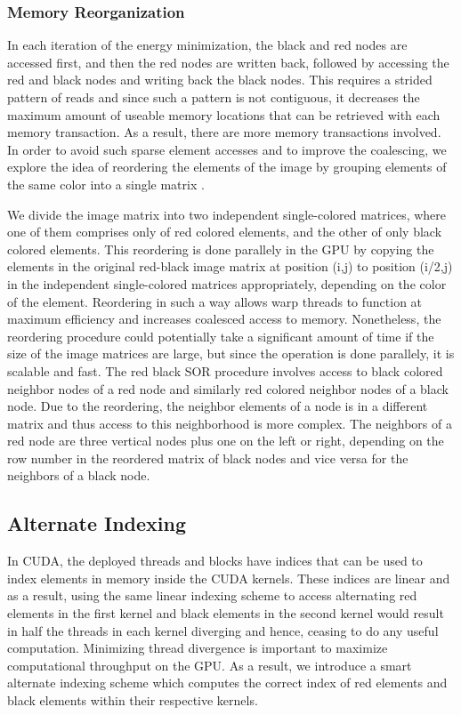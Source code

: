 \documentclass[english]{article}
\begin{document}
	\subsubsection{Memory Reorganization}
	In each iteration of the energy minimization, the black and red nodes are accessed first, and then the red nodes are written back, followed by accessing the red and black nodes and writing back the black nodes. This requires a strided pattern of reads and since such a pattern is not contiguous, it decreases the maximum amount of useable memory locations that can be retrieved with each memory transaction. As a result, there are more memory transactions involved. In order to avoid such sparse element accesses and to improve the coalescing, we explore the idea of reordering the elements of the image by grouping elements of the same color into a single matrix \cite{2}.\newline

	We divide the image matrix into two independent single-colored matrices, where one of them comprises only of red colored elements, and the other of only black colored elements. This reordering is done parallely in the GPU by copying the elements in the original red-black image matrix at position (i,j) to position (i/2,j) in the independent single-colored matrices appropriately, depending on the color of the element. Reordering in such a way allows warp threads to function at maximum efficiency and increases coalesced access to memory. Nonetheless, the reordering procedure could potentially take a significant amount of time if the size of the image matrices are large, but since the operation is done parallely, it is scalable and fast. The red black SOR procedure involves access to black colored neighbor nodes of a red node and similarly red colored neighbor nodes of a black node. Due to the reordering, the neighbor elements of a node is in a different matrix and thus access to this neighborhood is more complex. The neighbors of a red node are three vertical nodes plus one on the left or right, depending on the row number in the reordered matrix of black nodes and vice versa for the neighbors of a black node.

	\subsection{Alternate Indexing}
	In CUDA, the deployed threads and blocks have indices that can be used to index elements in memory inside the CUDA kernels. These indices are linear and as a result, using the same linear indexing scheme to access alternating red elements in the first kernel and black elements in the second kernel would result in half the threads in each kernel diverging and hence, ceasing to do any useful computation. Minimizing thread divergence is important to maximize computational throughput on the GPU. As a result, we introduce a smart alternate indexing scheme which computes the correct index of red elements and black elements within their respective kernels.\newline
\end{document}
